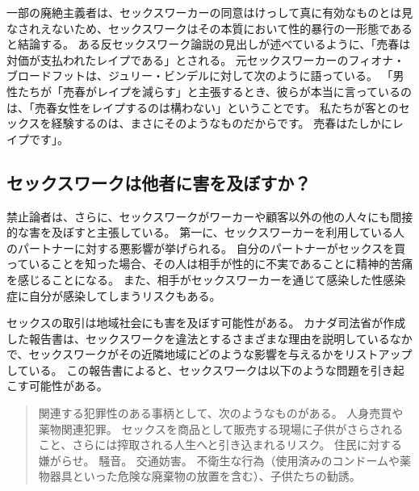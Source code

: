 \documentclass[paper=a4,book,openany]{jlreq}
\begin{document}
一部の廃絶主義者は、セックスワーカーの同意はけっして真に有効なものとは見なされえないため、セックスワークはその本質において性的暴行の一形態であると結論する。
ある反セックスワーク論説の見出しが述べているように、「売春は対価が支払われたレイプである」とされる\citep{raymond95:_prost_is_rape_thats_paid}。
元セックスワーカーのフィオナ・ブロードフットは、ジュリー・ビンデルに対して次のように語っている。
「男性たちが「売春がレイプを減らす」と主張するとき、彼らが本当に言っているのは、「売春女性をレイプするのは構わない」ということです。
私たちが客とのセックスを経験するのは、まさにそのようなものだからです。
売春はたしかにレイプです」\citep{bindel19:_real_face_prost}。

\subsection{セックスワークは他者に害を及ぼすか？}

禁止論者は、さらに、セックスワークがワーカーや顧客以外の他の人々にも間接的な害を及ぼすと主張している。
第一に、セックスワーカーを利用している人のパートナーに対する悪影響が挙げられる。
自分のパートナーがセックスを買っていることを知った場合、その人は相手が性的に不実であることに精神的苦痛を感じることになる。
また、相手がセックスワーカーを通じて感染した性感染症に自分が感染してしまうリスクもある。

セックスの取引は地域社会にも害を及ぼす可能性がある。
カナダ司法省が作成した報告書は、セックスワークを違法とするさまざまな理由を説明しているなかで、セックスワークがその近隣地域にどのような影響を与えるかをリストアップしている。
この報告書によると、セックスワークは以下のような問題を引き起こす可能性がある。

\begin{quote}
関連する犯罪性のある事柄として、次のようなものがある。
人身売買や薬物関連犯罪。
セックスを商品として販売する現場に子供がさらされること、さらには搾取される人生へと引き込まれるリスク。
住民に対する嫌がらせ。
騒音。
交通妨害。
不衛生な行為（使用済みのコンドームや薬物器具といった危険な廃棄物の放置を含む）、子供たちの勧誘。
\citep{department14:_techn_paper}
\end{quote}
\end{document}
